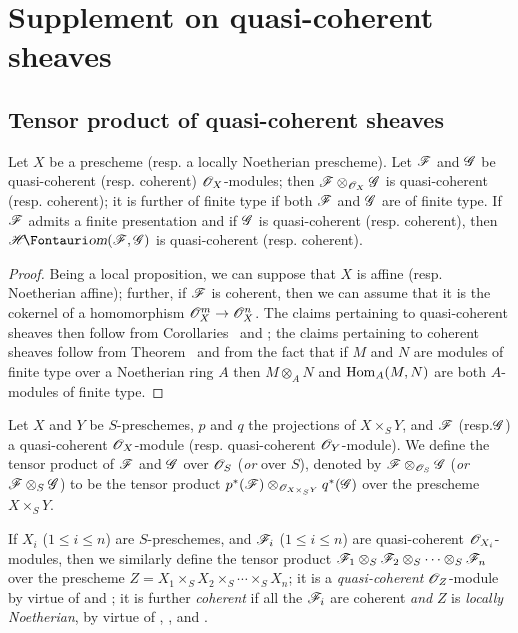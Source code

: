 \section{Supplement on quasi-coherent sheaves}
\label{section:I.9}

\subsection{Tensor product of quasi-coherent sheaves}
\label{subsection:I.9.1}

\begin{proposition}[9.1.1]
\label{I.9.1.1}
Let $X$ be a prescheme (resp. a locally Noetherian prescheme). Let $\mathscr{F}$ and
$\mathscr{G}$ be quasi-coherent (resp. coherent) $\mathscr{O}_X$-modules; then
$\mathscr{F}\otimes_{\mathscr{O}_X}\mathscr{G}$ is quasi-coherent (resp. coherent); it is further
of finite type if both $\mathscr{F}$ and $\mathscr{G}$ are of finite type. If
$\mathscr{F}$ admits a finite presentation and if $\mathscr{G}$ is quasi-coherent
(resp. coherent), then $\shHom(\sh{F},\sh{G})$ is quasi-coherent
(resp. coherent).
\end{proposition}

\begin{proof}
Being a local proposition, we can suppose that $X$ is affine (resp. Noetherian
affine); further, if $\mathscr{F}$ is coherent, then we can assume that it is the
cokernel of a homomorphism $\sh{O}_X^m\to\sh{O}_X^n$. The claims pertaining to
quasi-coherent sheaves then follow from Corollaries~ and ; the
claims pertaining to coherent sheaves follow from Theorem~ and from the fact
that if $M$ and $N$ are modules of finite type over a Noetherian ring $A$
then $M\otimes_A N$ and $\operatorname{Hom}_A(M,N)$ are both $A$-modules of finite type.
\end{proof}

\begin{definition}[9.1.2]
\label{I.9.1.2}
Let $X$ and $Y$ be $S$-preschemes, $p$ and
$q$ the projections of $X\times_S Y$, and $\mathscr{F}$ (resp.$\mathscr{G}$) a
quasi-coherent $\mathscr{O}_X$-module (resp. quasi-coherent $\mathscr{O}_Y$-module). We define the
tensor product of $\mathscr{F}$ and $\mathscr{G}$ over $\mathscr{O}_S$ (\emph{or} over $S$),
denoted by $\mathscr{F}\otimes_{\mathscr{O}_S}\mathscr{G}$
(\emph{or} $\mathscr{F}\otimes_S\mathscr{G}$) to be the tensor product
$p^*(\mathscr{F})\otimes_{\mathscr{O}_{X\times_S Y}}q^*(\mathscr{G})$ over the prescheme $X\times_S Y$.
\end{definition}

If $X_i$ ($1\leq i\leq n$) are $S$-preschemes, and $\mathscr{F}_i$ ($1\leq i\leq n$) are quasi-coherent
$\mathscr{O}_{X_i}$-modules, then we similarly define the tensor product
$\mathscr{F}_1\otimes_S\mathscr{F}_2\otimes_S\cdots\otimes_S\mathscr{F}_n$ over the
prescheme $Z=X_1\times_S X_2\times_S\cdots\times_S X_n$; it is a
\emph{quasi-coherent} $\mathscr{O}_Z$-module by virtue of  and
; it is further \emph{coherent} if all the $\mathscr{F}_i$ are coherent \emph{and}
$Z$ is \emph{locally Noetherian}, by virtue of ,
, and .

